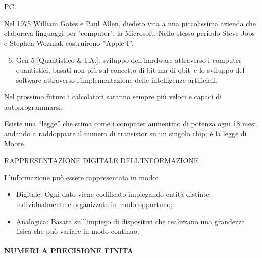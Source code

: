\documentclass[
]{article}
\providecommand{\tightlist}{%
  \setlength{\itemsep}{0pt}\setlength{\parskip}{0pt}}
\begin{document}
{PC.}

{Nel 1975 William Gates e Paul Allen, diedero vita a una piccolissima
azienda che elaborava linguaggi per "computer": la Microsoft. Nello
stesso periodo Steve Jobs e Stephen Wozniak costruirono }{''Apple
I''}{.}

{}

\begin{enumerate}
\setcounter{enumi}{5}
\tightlist
\item
  {Gen 5 {[}Quantistico \& I.A.{]}}{: sviluppo dell'hardware attraverso
  i computer quantistici, basati non più sul concetto di bit ma di
  }{qbit}{~e lo sviluppo del software attraverso l'implementazione delle
  intelligenze artificiali.}
\end{enumerate}

{Nel prossimo futuro i calcolatori saranno sempre più veloci e capaci di
autoprogrammarsi.}

{}

{Esiste una ``legge'' che stima come i computer aumentino di potenza
ogni 18 mesi, andando a raddoppiare il numero di transistor su un
singolo chip; è la }{legge di Moore}{.}

{}

{}

{}

{RAPPRESENTAZIONE DIGITALE DELL'INFORMAZIONE}

{}

{L'informazione può essere rappresentata in modo:}

{}

\begin{itemize}
\tightlist
\item
  {Digitale}{: Ogni dato viene codificato impiegando entità distinte
  individualmente e organizzate in modo opportuno;}
\end{itemize}

{}

\begin{itemize}
\tightlist
\item
  {Analogica}{: Basata sull'impiego di dispositivi che realizzano una
  grandezza fisica che può variare in modo continuo.}
\end{itemize}

{}

{}

\paragraph{\texorpdfstring{{NUMERI A PRECISIONE
FINITA}}{NUMERI A PRECISIONE FINITA}}\label{h.260ywngm6g79}
\end{document}
